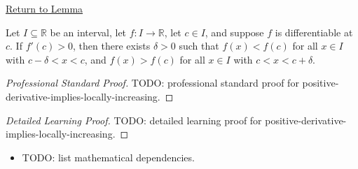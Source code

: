 \newpage
{}
\label{prf:positive-derivative-implies-locally-increasing}

\begin{remark*}[Return]
\hyperref[lem:positive-derivative-implies-locally-increasing]{Return to Lemma}
\end{remark*}

\begin{lemma*}
Let $I \subseteq \mathbb{R}$ be an interval, let $f : I \to \mathbb{R}$, let $c \in I$, and suppose $f$ is differentiable at $c$. If $f'(c) > 0$, then there exists $\delta > 0$ such that $f(x) < f(c)$ for all $x \in I$ with $c - \delta < x < c$, and $f(x) > f(c)$ for all $x \in I$ with $c < x < c + \delta$.
\end{lemma*}

\begin{proof}[Professional Standard Proof]
\LRAProofBodyStart
TODO: professional standard proof for positive-derivative-implies-locally-increasing.
\end{proof}

\begin{proof}[Detailed Learning Proof]
\LRAProofBodyStart
TODO: detailed learning proof for positive-derivative-implies-locally-increasing.
\end{proof}

\begin{remark*}
\end{remark*}

\begin{dependencies}
\begin{itemize}
  \item TODO: list mathematical dependencies.
\end{itemize}
\end{dependencies}

\clearpage
